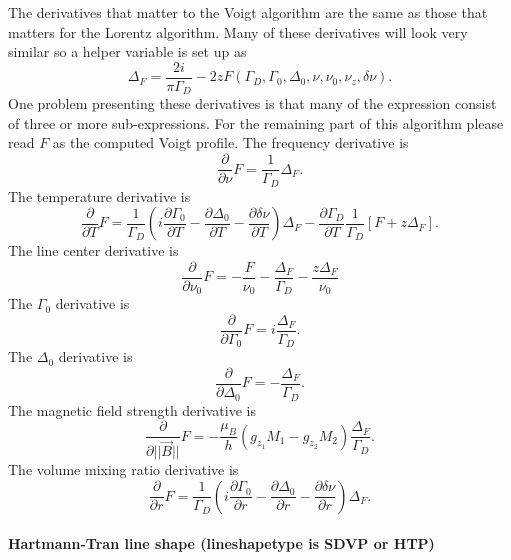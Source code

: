 The derivatives that matter to the Voigt algorithm are the same as those
that matters for the Lorentz algorithm.  Many of these derivatives will 
look very similar so a helper variable is set up as
\begin{equation}
 \Delta_F = \frac{2i}{\pi\Gamma_D} - 2zF(\Gamma_D, \Gamma_0, \Delta_0, \nu, \nu_0, \nu_z, \delta\nu).
\end{equation}
One problem presenting these derivatives is that many of the
expression consist of three or more sub-expressions.  For the
remaining part of this algorithm please read $F$ as the
computed Voigt profile.  The frequency derivative is
\begin{equation}
 \frac{\partial}{\partial\nu} F = \frac{1}{\Gamma_D}\Delta_F.
\end{equation}
The temperature derivative is
\begin{equation}
 \frac{\partial}{\partial T} F = \frac{1}{\Gamma_D}\left(i\frac{\partial\Gamma_0}{\partial T} - \frac{\partial\Delta_0}{\partial T} - \frac{\partial\delta\nu}{\partial T}\right)\Delta_F - \frac{\partial \Gamma_D}{\partial T} \frac{1}{\Gamma_D} \left[ F + z\Delta_F\right].
\end{equation}
The line center derivative is
\begin{equation}
 \frac{\partial}{\partial\nu_0} F = -\frac{F}{\nu_0} - \frac{\Delta_F}{\Gamma_D} - \frac{z\Delta_F}{\nu_0}
\end{equation}
The $\Gamma_0$ derivative is
\begin{equation}
 \frac{\partial}{\partial\Gamma_0} F = i \frac{\Delta_F}{\Gamma_D}.
\end{equation}
The $\Delta_0$ derivative is
\begin{equation}
 \frac{\partial}{\partial\Delta_0} F = - \frac{\Delta_F}{\Gamma_D}.
\end{equation}
The magnetic field strength derivative is
\begin{equation}
 \frac{\partial}{\partial ||\vec{B}||} F = - \frac{\mu_B}{h}\left(g_{z_1}M_1 - g_{z_2}M_2\right) \frac{\Delta_F}{\Gamma_D}.
\end{equation}
The volume mixing ratio derivative is
\begin{equation}
 \frac{\partial}{\partial r} F = \frac{1}{\Gamma_D} \left(i\frac{\partial\Gamma_0}{\partial r} - \frac{\partial\Delta_0}{\partial r} - \frac{\partial\delta\nu}{\partial r}\right) \Delta_F.
\end{equation}

\paragraph*{Hartmann-Tran line shape (lineshapetype is SDVP or HTP)} \


